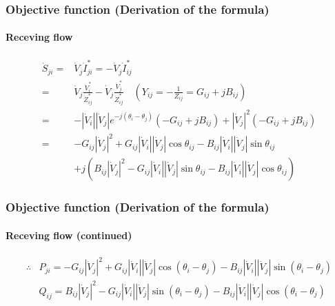 \documentclass[
	11pt, %
	aspectratio=169, %
]{beamer}
\begin{document}

\begin{frame}
	\frametitle{Objective function (Derivation of the formula)}
	\framesubtitle{Receving flow} %

	\begin{align*}
		\dot{S}_{ji}=&\dot{V}_{j}\dot{I}_{ji}^{*} = -\dot{V}_{j}\dot{I}_{ij}^{*}    \\
		=&\dot{V}_{j}\frac{\dot{V}_{i}^{*}}{\dot{Z}_{ij}^{*}} - \dot{V}_{j}\frac{\dot{V}_{j}^{*}}{\dot{Z}_{ij}^{*}} \quad \left(Y_{ij} =-\frac{1}{Z_{ij}} = G_{ij}+jB_{ij}\right) \\
		=&- \left\lvert \dot{V}_{i}\right\rvert\left\lvert \dot{V}_{j}\right\rvert e^{-j\left(\theta_{i}-\theta_{j}\right) } \left(-G_{ij}+jB_{ij}\right) + \left\lvert \dot{V}_{j}\right\rvert^{2} \left(-G_{ij}+jB_{ij}\right) \\
		=&-G_{ij}\left\lvert \dot{V}_{j}\right\rvert^{2} + G_{ij}\left\lvert \dot{V}_{i}\right\rvert\left\lvert \dot{V}_{j}\right\rvert \cos{\theta_{ij}} - B_{ij}\left\lvert \dot{V}_{i}\right\rvert\left\lvert \dot{V}_{j}\right\rvert \sin{\theta_{ij}}  \\
		 &+j\left( B_{ij}\left\lvert \dot{V}_{j}\right\rvert^{2} - G_{ij}\left\lvert \dot{V}_{i}\right\rvert\left\lvert \dot{V}_{j}\right\rvert \sin{\theta_{ij}} - B_{ij}\left\lvert \dot{V}_{i}\right\rvert\left\lvert \dot{V}_{j}\right\rvert \cos{\theta_{ij}} \right) 
	\end{align*}


\end{frame}


\begin{frame}
	\frametitle{Objective function (Derivation of the formula)}
	\framesubtitle{Receving flow (continued)} %

	\begin{align*}
	 	\therefore &P_{ji}=-G_{ij}\left\lvert \dot{V}_{j}\right\rvert^{2} + G_{ij}\left\lvert \dot{V}_{i}\right\rvert\left\lvert \dot{V}_{j}\right\rvert \cos{\left(\theta_{i}-\theta_{j}\right)} - B_{ij}\left\lvert \dot{V}_{i}\right\rvert\left\lvert \dot{V}_{j}\right\rvert \sin{\left(\theta_{i}-\theta_{j}\right)}\\
		&Q_{ij}=B_{ij}\left\lvert \dot{V}_{j}\right\rvert^{2} - G_{ij}\left\lvert \dot{V}_{i}\right\rvert\left\lvert \dot{V}_{j}\right\rvert \sin{\left(\theta_{i}-\theta_{j}\right)} - B_{ij}\left\lvert \dot{V}_{i}\right\rvert\left\lvert \dot{V}_{j}\right\rvert \cos{\left(\theta_{i}-\theta_{j}\right)}
	\end{align*}

	
\end{frame}
\end{document}
